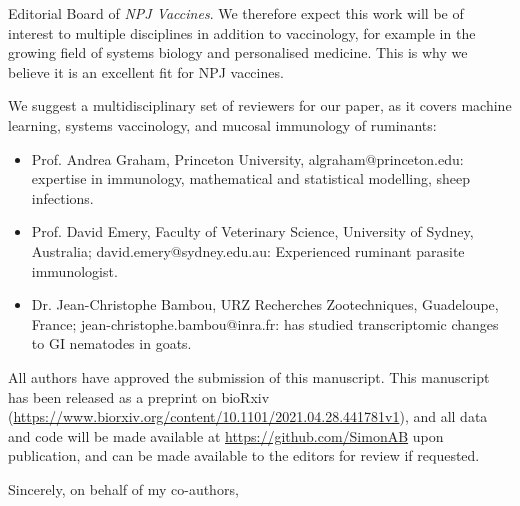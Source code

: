 \documentclass[11pt, a4paper]{letter} %
\begin{document}
\begin{letter}{
    Editorial Board of \emph{NPJ Vaccines}.
}
We therefore expect this work will be of interest to multiple disciplines in addition to vaccinology, for example in the growing field of systems biology and personalised medicine. This is why we believe it is an excellent fit for NPJ vaccines.

We suggest a multidisciplinary set of reviewers for our paper, as it covers machine learning, systems vaccinology, and mucosal immunology of ruminants:

\begin{itemize}
        \item Prof. Andrea Graham, Princeton University, algraham@princeton.edu: expertise in immunology, mathematical and statistical modelling, sheep infections.
        \item Prof. David Emery, Faculty of Veterinary Science, University of Sydney, Australia; david.emery@sydney.edu.au: Experienced ruminant parasite immunologist.
        \item Dr. Jean-Christophe Bambou, URZ Recherches Zootechniques, Guadeloupe, France; jean-christophe.bambou@inra.fr: has studied transcriptomic changes to GI nematodes in goats.
\end{itemize}

All authors have approved the submission of this manuscript. This manuscript has been released as a preprint on bioRxiv (\url{https://www.biorxiv.org/content/10.1101/2021.04.28.441781v1}), and all data and code will be made available at \url{https://github.com/SimonAB} upon publication, and can be made available to the editors for review if requested.

\closing{Sincerely, on behalf of my co-authors,}







\end{letter}
\end{document}
